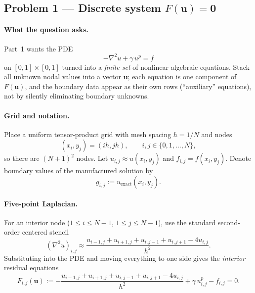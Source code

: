 \documentclass[11pt]{article}
\begin{document}
\subsection*{Problem 1 --- Discrete system $F(\mathbf{u})=\mathbf{0}$}

\paragraph{What the question asks.}
Part~1 wants the PDE
\[
  -\nabla^2 u + \gamma\, u^{p} = f
\]
on $[0,1]\times[0,1]$ turned into a \emph{finite set} of nonlinear algebraic equations. Stack all unknown nodal values into a vector $\mathbf{u}$; each equation is one component of $F(\mathbf{u})$, and the boundary data appear as their own rows (``auxiliary'' equations), not by silently eliminating boundary unknowns.

\paragraph{Grid and notation.}
Place a uniform tensor-product grid with mesh spacing $h=1/N$ and nodes
\[
  (x_i,y_j) = (ih,jh),\qquad i,j \in \{0,1,\ldots,N\},
\]
so there are $(N{+}1)^2$ nodes. Let $u_{i,j}\approx u(x_i,y_j)$ and $f_{i,j}=f(x_i,y_j)$. Denote boundary values of the manufactured solution by
\[
  g_{i,j} := u_{\mathrm{exact}}(x_i,y_j).
\]

\paragraph{Five-point Laplacian.}
For an interior node ($1\le i\le N-1$, $1\le j\le N-1$), use the standard second-order centered stencil
\[
  (\nabla^2 u)_{i,j} \approx \frac{u_{i-1,j}+u_{i+1,j}+u_{i,j-1}+u_{i,j+1}-4u_{i,j}}{h^2}.
\]
Substituting into the PDE and moving everything to one side gives the \emph{interior} residual equations
\begin{equation}
\label{eq:Finterior}
  F_{i,j}(\mathbf{u})
  := -\frac{u_{i-1,j}+u_{i+1,j}+u_{i,j-1}+u_{i,j+1}-4u_{i,j}}{h^2}
     + \gamma\, u_{i,j}^{p} - f_{i,j}
  = 0.
\end{equation}
\end{document}
